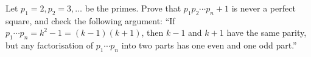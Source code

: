 Let $p_1=2,p_2=3,\dots$ be the primes. Prove that $p_1p_2\cdots p_n+1$ is never a perfect square, and check the following argument: ``If $p_1\cdots p_n=k^2-1=(k-1)(k+1)$, then $k-1$ and $k+1$ have the same parity, but any factorisation of $p_1\cdots p_n$ into two parts has one even and one odd part.''
